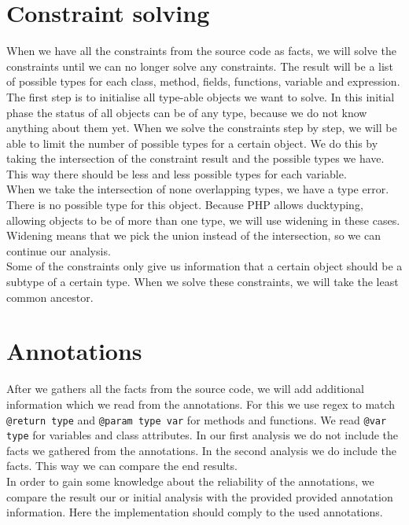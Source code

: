 \documentclass[../main.tex]{subfiles}
\begin{document}
    \section{Constraint solving}\label{sec:research:constraint_solving}
    When we have all the constraints from the source code as facts, we will solve the constraints until we can no longer solve any constraints.
    The result will be a list of possible types for each class, method, fields, functions, variable and expression.
    \\
    The first step is to initialise all type-able objects we want to solve.
    In this initial phase the status of all objects can be of any type, because we do not know anything about them yet.
    When we solve the constraints step by step, we will be able to limit the number of possible types for a certain object.
    We do this by taking the intersection of the constraint result and the possible types we have.
    This way there should be less and less possible types for each variable.
    \\
    When we take the intersection of none overlapping types, we have a type error.
    There is no possible type for this object.
    Because PHP allows ducktyping, allowing objects to be of more than one type, we will use widening in these cases.
    Widening means that we pick the union instead of the intersection, so we can continue our analysis.
    \\
    Some of the constraints only give us information that a certain object should be a subtype of a certain type.
    When we solve these constraints, we will take the least common ancestor.
    
    \section{Annotations}\label{sec:annotations}
    After we gathers all the facts from the source code, we will add additional information which we read from the annotations.
    For this we use regex to match \texttt{@return type} and \texttt{@param type var} for methods and functions.
    We read \texttt{@var type} for variables and class attributes.
    In our first analysis we do not include the facts we gathered from the annotations. 
    In the second analysis we do include the facts.
    This way we can compare the end results.
    \\
    In order to gain some knowledge about the reliability of the annotations, we compare the result our or initial analysis with the provided provided annotation information.
    Here the implementation should comply to the used annotations.
        
\end{document}
